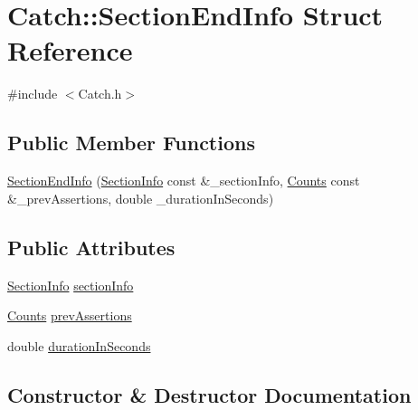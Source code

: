 \hypertarget{struct_catch_1_1_section_end_info}{}\section{Catch\+:\+:Section\+End\+Info Struct Reference}
\label{struct_catch_1_1_section_end_info}


{\ttfamily \#include $<$Catch.\+h$>$}

\subsection*{Public Member Functions}
\begin{DoxyCompactItemize}
\item 
\hyperlink{struct_catch_1_1_section_end_info_abc9381c7c22b6907317ec985ccaa6713}{Section\+End\+Info} (\hyperlink{struct_catch_1_1_section_info}{Section\+Info} const \&\+\_\+section\+Info, \hyperlink{struct_catch_1_1_counts}{Counts} const \&\+\_\+prev\+Assertions, double \+\_\+duration\+In\+Seconds)
\end{DoxyCompactItemize}
\subsection*{Public Attributes}
\begin{DoxyCompactItemize}
\item 
\hyperlink{struct_catch_1_1_section_info}{Section\+Info} \hyperlink{struct_catch_1_1_section_end_info_a2d44793392cb83735d086d726822abe9}{section\+Info}
\item 
\hyperlink{struct_catch_1_1_counts}{Counts} \hyperlink{struct_catch_1_1_section_end_info_ae70b154cbc05b5dd2901d97f89303d8c}{prev\+Assertions}
\item 
double \hyperlink{struct_catch_1_1_section_end_info_a7c262f2dab9cff166b8eca620c47eea5}{duration\+In\+Seconds}
\end{DoxyCompactItemize}


\subsection{Constructor \& Destructor Documentation}
